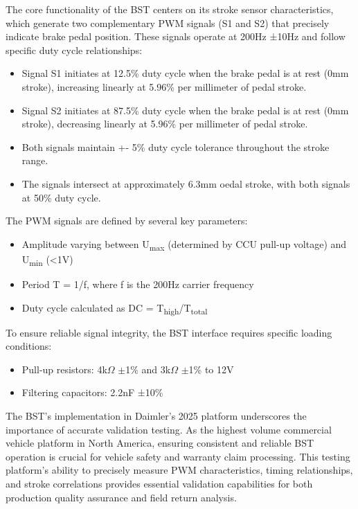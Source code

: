 \documentclass[12pt]{article}
\begin{document}
The core functionality of the BST centers on its stroke sensor characteristics,
which generate two complementary PWM signals (S1 and S2) that precisely
indicate brake pedal position. These signals operate at 200Hz ±10Hz and follow
specific duty cycle relationships:

\begin{itemize} \item Signal S1 initiates at 12.5\% duty cycle when the brake
pedal is at rest (0mm stroke), increasing linearly at 5.96\% per millimeter of
pedal stroke. \item Signal S2 initiates at 87.5\% duty cycle when the brake
pedal is at rest (0mm stroke), decreasing linearly at 5.96\% per millimeter of
pedal stroke. \item Both signals maintain +- 5\% duty cycle tolerance
throughout the stroke range. \item The signals intersect at approximately 6.3mm
oedal stroke, with both signals at 50\% duty cycle. \end{itemize}

The PWM signals are defined by several key parameters: \begin{itemize} \item
Amplitude varying between U\textsubscript{max} (determined by CCU pull-up
voltage) and U\textsubscript{min} (<1V) \item Period T = 1/f, where f is the
200Hz carrier frequency \item Duty cycle calculated as DC =
T\textsubscript{high}/T\textsubscript{total} \end{itemize}

To ensure reliable signal integrity, the BST interface requires specific
loading conditions: \begin{itemize} \item Pull-up resistors: 4k$\Omega$
$\pm$1\% and 3k$\Omega$ $\pm$1\% to 12V \item Filtering capacitors: 2.2nF ±10\%
\end{itemize}

      The BST's implementation in Daimler's 2025 platform underscores the
      importance of accurate validation testing. As the highest volume
      commercial vehicle platform in North America, ensuring consistent and
      reliable BST operation is crucial for vehicle safety and warranty claim
      processing. This testing platform's ability to precisely measure PWM
      characteristics, timing relationships, and stroke correlations provides
      essential validation capabilities for both production quality assurance
      and field return analysis.
\end{document}
